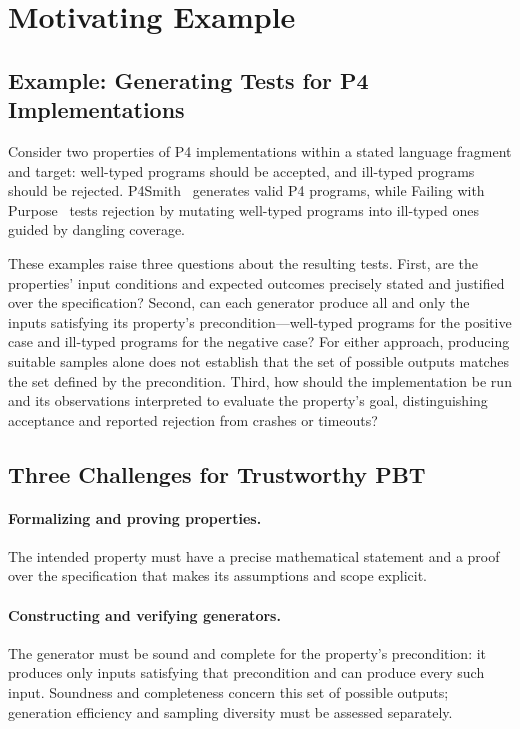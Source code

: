 \section{Motivating Example}
\label{sec:motivation}

\subsection{Example: Generating Tests for P4 Implementations}
\label{sec:testing-type-checking}

Consider two properties of P4 implementations within a stated language fragment and target: well-typed programs should be accepted, and ill-typed programs should be rejected.
P4Smith~\cite{ruffy20gauntlet} generates valid P4 programs, while Failing with Purpose~\cite{lee26fwp} tests rejection by mutating well-typed programs into ill-typed ones guided by dangling coverage.

These examples raise three questions about the resulting tests.
First, are the properties' input conditions and expected outcomes precisely stated and justified over the specification?
Second, can each generator produce all and only the inputs satisfying its property's precondition---well-typed programs for the positive case and ill-typed programs for the negative case?
For either approach, producing suitable samples alone does not establish that the set of possible outputs matches the set defined by the precondition.
Third, how should the implementation be run and its observations interpreted to evaluate the property's goal, distinguishing acceptance and reported rejection from crashes or timeouts?

\subsection{Three Challenges for Trustworthy PBT}
\label{sec:three-propositions}

\paragraph{Formalizing and proving properties.}
\label{sec:property-proposition}
The intended property must have a precise mathematical statement and a proof over the specification that makes its assumptions and scope explicit.

\paragraph{Constructing and verifying generators.}
\label{sec:generator-propositions}
The generator must be sound and complete for the property's precondition: it produces only inputs satisfying that precondition and can produce every such input.
Soundness and completeness concern this set of possible outputs; generation efficiency and sampling diversity must be assessed separately.

